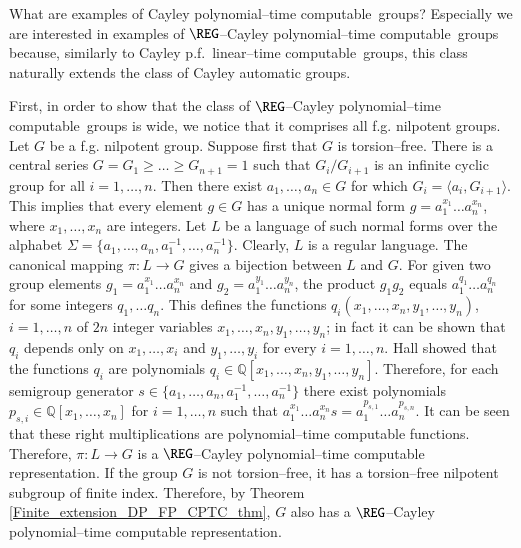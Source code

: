 \documentclass[article,12pt]{elsarticle}
\newcommand\distfun{Cayley distance function}
\newcommand\linearC{Cayley p.f.~linear--time computable}
\newcommand\polyC{Cayley polynomial--time computable}
\begin{document}
What are examples of \polyC\ groups? Especially we 
are interested in examples of 
$\REG$--\polyC\ groups because,
similarly to \linearC\ groups, 
this class naturally extends the class of 
Cayley automatic groups.    
  

First, in order to show that the class of
$\REG$--\polyC\ groups is wide,
we notice that it comprises all f.g. nilpotent groups.    
Let $G$ be a f.g. nilpotent group. 
Suppose first that $G$ is torsion--free.  
There is a central series 
$G = G_1 \geqslant  
\dots \geqslant G_{n+1} = 1$ such that  
$G_i / G_{i+1}$ is an infinite cyclic group for 
all $i =1,\dots,n$. Then there exist  
$a_1,\dots,a_n \in G$ for which
$G_i = \langle a_i , G_{i+1} \rangle$. 
This implies that every element $g \in G$ 
has a unique normal form 
$g = a_1 ^{x_1} \dots a_n ^{x_n}$, where  
$x_1,\dots,x_n$  are integers. 
Let $L$ be a language of such normal forms 
over the alphabet 
$\Sigma = \{a_1,\dots,a_n,a_1 ^{-1},\dots,a_n ^{-1}\}$. 
Clearly, $L$ is a regular language. 
The canonical mapping $\pi : L \rightarrow G$ 
gives a bijection between $L$ and $G$.   
For given two group elements  
$g_1 = a_1 ^{x_1} \dots a_n ^{x_n}$ 
and $g_2= a_1 ^{y_1} \dots a_n ^{y_n}$, the product  
$g_1 g_2$ equals $a_1 ^{q_1} \dots a_n ^{q_n}$ 
for some integers $q_1, \dots q_n$. This defines the 
functions $q_i (x_1,\dots,x_n, y_1,\dots,y_n)$, 
$i=1,\dots,n$ of $2n$ integer variables
$x_1,\dots,x_n,y_1, \dots, y_n$; in fact 
it can be shown that $q_i$ depends only on $x_1,\dots,x_i$ and $y_1,\dots,y_i$ for every $i=1,\dots,n$. 
Hall showed \cite{Hall57} that the functions 
$q_i$ are polynomials 
$q_i \in \mathbb{Q}[x_1,\dots, x_n, y_1,\dots, y_n]$.
Therefore, for each semigroup generator 
$s \in \{a_1,\dots, a_n, a_1^{-1},\dots, a_n^{-1} \}$ 
there exist polynomials 
$p_{s,i} \in \mathbb{Q}[x_1,\dots,x_n]$ 
for $i=1,\dots,n$ such that 
$a_1 ^{x_1} \dots a_n ^{x_n} s = 
a_1 ^{p_{s,1}}\dots a_n ^{p_{s,n}}$.  
It can be seen that these right multiplications are 
polynomial--time computable functions.  
Therefore, $\pi : L  \rightarrow G$
is a $\REG$--Cayley polynomial--time computable 
representation.
If the group $G$ is not torsion--free, it  
has a torsion--free nilpotent subgroup of 
finite index. Therefore, by Theorem \ref{Finite_extension_DP_FP_CPTC_thm}, 
$G$ also has a $\REG$--Cayley polynomial--time computable 
representation. 

\end{document}
